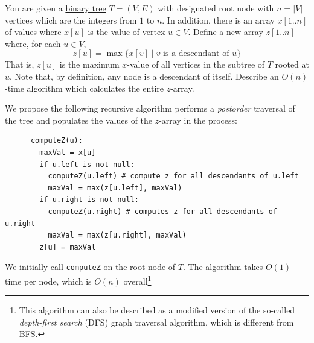   \begin{exercise}[DPV 3.19]
    You are given a \hyperref[def:binary-tree]{binary tree} $T = (V, E)$ with designated root node with $n = |V|$ vertices which are the integers from $1$ to $n$. In addition, there is an array $x[1..n]$ of values where $x[u]$ is the value of vertex $u \in V$. Define a new array $z[1..n]$ where, for each $u \in V$,	
    \begin{equation}
      z[u] = \max \{ x[v] \mid \text{$v$ is a descendant of $u$}\}
    \end{equation}
    That is, $z[u]$ is the maximum $x$-value of all vertices in the subtree of $T$ rooted at $u$. Note that, by definition, any node is a descendant of itself. Describe an $O(n)$-time algorithm which calculates the entire $z$-array.
  \end{exercise}
  \begin{solution}
    We propose the following recursive algorithm performs a \emph{postorder} traversal of the tree and populates the values of the $z$-array in the process:
    \begin{lstlisting}
      computeZ(u):
        maxVal = x[u]
        if u.left is not null:
          computeZ(u.left) # compute z for all descendants of u.left
          maxVal = max(z[u.left], maxVal)
        if u.right is not null:
          computeZ(u.right) # computes z for all descendants of u.right
          maxVal = max(z[u.right], maxVal)
        z[u] = maxVal
    \end{lstlisting}
    We initially call \texttt{computeZ} on the root node of $T$.        The algorithm takes $O(1)$ time per node, which is $O(n)$ overall\footnote{This algorithm can also be described as a modified version of the so-called \emph{depth-first search} (DFS) graph traversal algorithm, which is different from BFS.}
  \end{solution}


